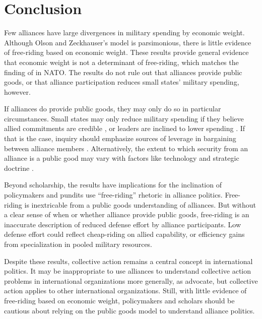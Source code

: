 \documentclass[12pt]{article}
\begin{document}
\section{Conclusion}

Few alliances have large divergences in military spending by economic weight. 
Although Olson and Zeckhauser's model is parsimonious, there is little evidence of free-riding based on economic weight. 
These results provide general evidence that economic weight is not a determinant of free-riding, which matches the finding of \citet{PluemperNeumayer2015} in NATO. 
The results do not rule out that alliances provide public goods, or that alliance participation reduces small states' military spending, however. 


If alliances do provide public goods, they may only do so in particular circumstances. 
Small states may only reduce military spending if they believe allied commitments are credible \citep{Goldstein1995, DigiuseppePoast2016}, or leaders are inclined to lower spending \citep{Fuhrmann2020}. 
If that is the case, inquiry should emphasize sources of leverage in bargaining between alliance members \citep{Morrow1991, Norrlof2010, Brooksetal2013, Johnson2015, Kim2016}. 
Alternatively, the extent to which security from an alliance is a public good may vary with factors like technology and strategic doctrine \citep{SandlerHartley2001}. 


Beyond scholarship, the results have implications for the inclination of policymakers and pundits use ``free-riding'' rhetoric in alliance politics. 
Free-riding is inextricable from a public goods understanding of alliances.
But without a clear sense of when or whether alliance provide public goods, free-riding is an inaccurate description of reduced defense effort by alliance participants.  
Low defense effort could reflect cheap-riding on allied capability, or efficiency gains from specialization in pooled military resources. 


Despite these results, collective action remains a central concept in international politics.   
It may be inappropriate to use alliances to understand collective action problems in international organizations more generally, as \citet[pg. 266-7]{OlsonZeckhauser1966} advocate, but collective action applies to other international organizations. 
Still, with little evidence of free-riding based on economic weight, policymakers and scholars should be cautious about relying on the public goods model to understand alliance politics.  



\singlespace


 
\end{document}
